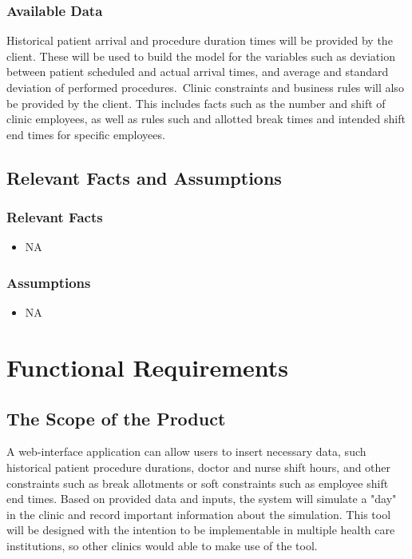 \documentclass[12pt, titlepage]{article}
\begin{document}
\subsubsection{Available Data}
Historical patient arrival and procedure duration times will be provided by the client. These will be used to build the model for the variables such as deviation between patient scheduled and actual arrival times, and average and standard deviation of performed procedures.\newline\
Clinic constraints and business rules will also be provided by the client. This includes facts such as the number and shift of clinic employees, as well as rules such and allotted break times and intended shift end times for specific employees.
\newline\

\subsection{Relevant Facts and Assumptions} 
\subsubsection{Relevant Facts}
\begin{itemize}
	\item NA
\end{itemize}
\subsubsection{Assumptions}
\begin{itemize}
	\item NA
\end{itemize}

\section{Functional Requirements} 
\subsection{The Scope of the Product}
A web-interface application can allow users to insert necessary data, such historical patient procedure durations, doctor and nurse shift hours, and other constraints such as break allotments or soft constraints such as employee shift end times. Based on provided data and inputs, the system will
simulate a "day" in the clinic and record important information about the simulation.  This tool will be designed with the intention to be implementable in multiple health care institutions, so other clinics would able to make use of the tool.
\end{document}
